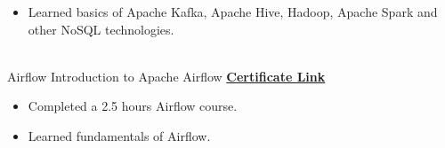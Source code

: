 \documentclass[letterpaper]{DS_class_file} %
\begin{document}
\begin{twenty}
{{\begin{itemize}
				\item Learned basics of Apache Kafka, Apache Hive, Hadoop, Apache Spark and other NoSQL technologies.
		\end{itemize}}
	}
	\\
	\twentyitem
	{Airflow}
	{}
	{\hspace{0.3cm}Introduction to Apache Airflow}
	{\href{https://www.udemy.com/certificate/UC-634f3164-fcb1-4bdf-b5b0-909134dd3252/}{\textbf{Certificate Link}}}
	{}
	{
		{\begin{itemize}
				\item Completed a 2.5 hours Airflow course.
                    \item Learned fundamentals of Airflow.
		\end{itemize}}
	}
	

	
\end{twenty}



	
\end{document}
